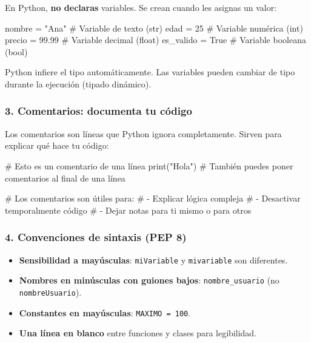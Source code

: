 \documentclass[
  doc,
  floatsintext,
  longtable,
  a4paper,
  nolmodern,
  notxfonts,
  notimes,
  12pt,
  colorlinks=true,linkcolor=blue,citecolor=blue,urlcolor=blue]{apa7}
\newenvironment{Shaded}{\begin{snugshade}}{\end{snugshade}}
\newcommand{\BuiltInTok}[1]{\textcolor[rgb]{0.00,0.23,0.31}{#1}}
\newcommand{\CommentTok}[1]{\textcolor[rgb]{0.37,0.37,0.37}{#1}}
\newcommand{\DecValTok}[1]{\textcolor[rgb]{0.68,0.00,0.00}{#1}}
\newcommand{\FloatTok}[1]{\textcolor[rgb]{0.68,0.00,0.00}{#1}}
\newcommand{\NormalTok}[1]{\textcolor[rgb]{0.00,0.23,0.31}{#1}}
\newcommand{\OperatorTok}[1]{\textcolor[rgb]{0.37,0.37,0.37}{#1}}
\newcommand{\StringTok}[1]{\textcolor[rgb]{0.13,0.47,0.30}{#1}}
\newcommand{\VariableTok}[1]{\textcolor[rgb]{0.07,0.07,0.07}{#1}}
\providecommand{\tightlist}{%
  \setlength{\itemsep}{0pt}\setlength{\parskip}{0pt}}
\begin{document}
En Python, \textbf{no declaras} variables. Se crean cuando les asignas
un valor:

\begin{Shaded}
\begin{Highlighting}[]
\NormalTok{nombre }\OperatorTok{=} \StringTok{"Ana"}      \CommentTok{\# Variable de texto (str)}
\NormalTok{edad }\OperatorTok{=} \DecValTok{25}           \CommentTok{\# Variable numérica (int)}
\NormalTok{precio }\OperatorTok{=} \FloatTok{99.99}      \CommentTok{\# Variable decimal (float)}
\NormalTok{es\_valido }\OperatorTok{=} \VariableTok{True}    \CommentTok{\# Variable booleana (bool)}
\end{Highlighting}
\end{Shaded}

Python infiere el tipo automáticamente. Las variables pueden cambiar de
tipo durante la ejecución (tipado dinámico).

\subsubsection{3. Comentarios: documenta tu
código}\label{comentarios-documenta-tu-cuxf3digo}

Los comentarios son líneas que Python ignora completamente. Sirven para
explicar qué hace tu código:

\begin{Shaded}
\begin{Highlighting}[]
\CommentTok{\# Esto es un comentario de una línea}
\BuiltInTok{print}\NormalTok{(}\StringTok{"Hola"}\NormalTok{)  }\CommentTok{\# También puedes poner comentarios al final de una línea}

\CommentTok{\# Los comentarios son útiles para:}
\CommentTok{\# {-} Explicar lógica compleja}
\CommentTok{\# {-} Desactivar temporalmente código}
\CommentTok{\# {-} Dejar notas para ti mismo o para otros}
\end{Highlighting}
\end{Shaded}

\subsubsection{4. Convenciones de sintaxis (PEP
8)}\label{convenciones-de-sintaxis-pep-8}

\begin{itemize}
\tightlist
\item
  \textbf{Sensibilidad a mayúsculas}: \texttt{miVariable} y
  \texttt{mivariable} son diferentes.
\item
  \textbf{Nombres en minúsculas con guiones bajos}:
  \texttt{nombre\_usuario} (no \texttt{nombreUsuario}).
\item
  \textbf{Constantes en mayúsculas}: \texttt{MAXIMO\ =\ 100}.
\item
  \textbf{Una línea en blanco} entre funciones y clases para
  legibilidad.
\end{itemize}
\end{document}

